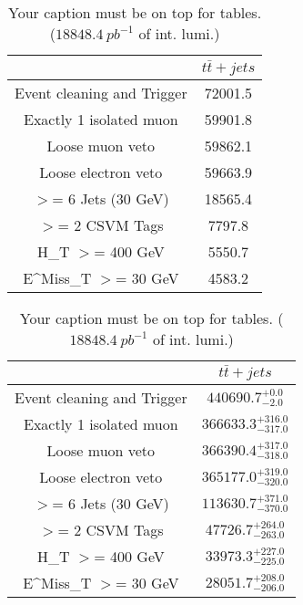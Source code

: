 \documentclass{article}
\begin{document}
\begin{table}
\caption{Your caption must be on top for tables. ($18848.4~pb^{-1}$ of int. lumi.)}
\label{tab:}
\centering
\begin{tabular}{|c|c|}
\toprule
&$t\bar{t}+jets$	\\

\midrule
Event cleaning and Trigger&	72001.5	\\

Exactly 1 isolated muon&	59901.8	\\

Loose muon veto&	59862.1	\\

Loose electron veto&	59663.9	\\

$>$= 6 Jets (30 GeV)&	18565.4	\\

$>$= 2 CSVM Tags&	7797.8	\\

H_{T} $>$=  400 GeV&	5550.7	\\

E^{Miss}_{T} $>$=  30 GeV&	4583.2	\\

\bottomrule
\end{tabular}
\end{table}
\begin{table}
\caption{Your caption must be on top for tables. ($18848.4~pb^{-1}$ of int. lumi.)}
\label{tab:}
\centering
\begin{tabular}{|c|c|}
\toprule
&$t\bar{t}+jets$	\\

\midrule
Event cleaning and Trigger&	$440690.7^{+0.0}_{-2.0}$	\\

Exactly 1 isolated muon&	$366633.3^{+316.0}_{-317.0}$	\\

Loose muon veto&	$366390.4^{+317.0}_{-318.0}$	\\

Loose electron veto&	$365177.0^{+319.0}_{-320.0}$	\\

$>$= 6 Jets (30 GeV)&	$113630.7^{+371.0}_{-370.0}$	\\

$>$= 2 CSVM Tags&	$47726.7^{+264.0}_{-263.0}$	\\

H_{T} $>$=  400 GeV&	$33973.3^{+227.0}_{-225.0}$	\\

E^{Miss}_{T} $>$=  30 GeV&	$28051.7^{+208.0}_{-206.0}$	\\

\bottomrule
\end{tabular}
\end{table}
\end{document}
